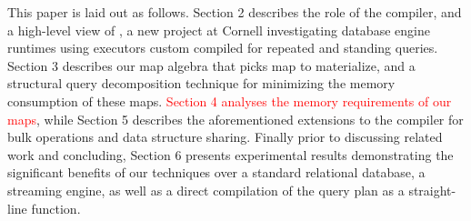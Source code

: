 This paper is laid out as follows. Section 2 describes the role of the compiler,
and a high-level view of \compiler, a new project at Cornell investigating
database engine runtimes using executors custom compiled for repeated and
standing queries.
Section 3 describes our map algebra that picks map to materialize, and a
structural query decomposition technique for minimizing the memory consumption of
these maps.
\textcolor{red}{Section 4 analyses the memory requirements of our
maps}, while Section 5 describes the aforementioned extensions to the compiler
for bulk operations and data structure sharing. Finally prior to discussing
related work and concluding, Section 6 presents experimental results
demonstrating the significant benefits of our techniques over a standard
relational database, a streaming engine, as well as a direct compilation of the
query plan as a straight-line function.







